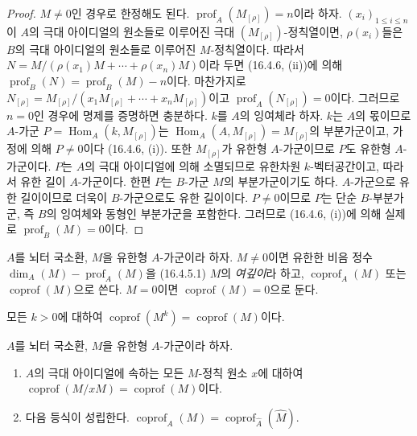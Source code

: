 \begin{proof}
$M\neq0$인 경우로 한정해도 된다.
$\operatorname{prof}_A(M_{[\rho]})=n$이라 하자.
$(x_i)_{1\leq i\leq n}$이 $A$의 극대 아이디얼의 원소들로 이루어진
극대 $(M_{[\rho]})$-정칙열이면, $\rho(x_i)$들은 $B$의 극대 아이디얼의
원소들로 이루어진 $M$-정칙열이다. 따라서
$N=M/(\rho(x_1)M+\cdots+\rho(x_n)M)$이라 두면 (16.4.6, (ii))에 의해
$\operatorname{prof}_B(N)=\operatorname{prof}_B(M)-n$이다. 마찬가지로
$N_{[\rho]}=M_{[\rho]}/(x_1M_{[\rho]}+\cdots+x_nM_{[\rho]})$이고
$\operatorname{prof}_A(N_{[\rho]})=0$이다. 그러므로 $n=0$인 경우에
명제를 증명하면 충분하다. $k$를 $A$의 잉여체라 하자. $k$는 $A$의
몫이므로 $A$-가군
$P=\operatorname{Hom}_A(k,M_{[\rho]})$는
$\operatorname{Hom}_A(A,M_{[\rho]})=M_{[\rho]}$의 부분가군이고,
가정에 의해 $P\neq0$이다 (16.4.6, (i)). 또한 $M_{[\rho]}$가 유한형
$A$-가군이므로 $P$도 유한형 $A$-가군이다. $P$는 $A$의 극대
아이디얼에 의해 소멸되므로 유한차원 $k$-벡터공간이고, 따라서 유한
길이 $A$-가군이다. 한편 $P$는 $B$-가군 $M$의 부분가군이기도 하다.
$A$-가군으로 유한 길이이므로 더욱이 $B$-가군으로도 유한 길이이다.
$P\neq0$이므로 $P$는 단순 $B$-부분가군, 즉 $B$의 잉여체와 동형인
부분가군을 포함한다. 그러므로 (16.4.6, (i))에 의해 실제로
$\operatorname{prof}_B(M)=0$이다.
\end{proof}

\begin{definition}[16.4.9]
\label{0.16.4.9-fr}
$A$를 뇌터 국소환, $M$을 유한형 $A$-가군이라 하자. $M\neq0$이면
유한한 비음 정수
$\dim_A(M)-\operatorname{prof}_A(M)$을 (16.4.5.1) $M$의
\emph{여깊이}라 하고,
$\operatorname{coprof}_A(M)$ 또는 $\operatorname{coprof}(M)$으로
쓴다. $M=0$이면 $\operatorname{coprof}(M)=0$으로 둔다.

모든 $k>0$에 대하여
$\operatorname{coprof}(M^k)=\operatorname{coprof}(M)$이다.
\end{definition}

\begin{proposition}[16.4.10]
\label{0.16.4.10-fr}
$A$를 뇌터 국소환, $M$을 유한형 $A$-가군이라 하자.
\begin{enumerate}
  \item[(i)] $A$의 극대 아이디얼에 속하는 모든 $M$-정칙 원소 $x$에
  대하여 $\operatorname{coprof}(M/xM)=\operatorname{coprof}(M)$이다.
  \item[(ii)] 다음 등식이 성립한다.
  $\operatorname{coprof}_A(M)=
  \operatorname{coprof}_{\widehat A}(\widehat M)$.
\end{enumerate}
\end{proposition}

